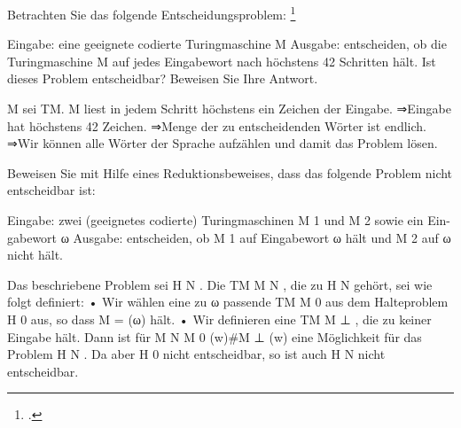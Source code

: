 \documentclass{bschlangaul-aufgabe}
\begin{document}

\begin{description}


\item Betrachten Sie das folgende Entscheidungsproblem:
\footcite[Aufgabe 10]{theo:ab:4}

Eingabe: eine geeignete codierte Turingmaschine M
Ausgabe: entscheiden, ob die Turingmaschine M auf jedes Eingabewort nach
höchstens 42 Schritten hält.
Ist dieses Problem entscheidbar? Beweisen Sie Ihre Antwort.

\begin{bAntwort}
M sei TM. M liest in jedem Schritt höchstens ein Zeichen der Eingabe.
⇒Eingabe hat höchstens 42 Zeichen.
⇒Menge der zu entscheidenden Wörter ist endlich.
⇒Wir können alle Wörter der Sprache aufzählen und damit das Problem lösen.
\end{bAntwort}


\item Beweisen Sie mit Hilfe eines Reduktionsbeweises, dass das folgende
Problem nicht entscheidbar ist:

Eingabe: zwei (geeignetes codierte) Turingmaschinen M 1 und M 2 sowie ein Ein-
gabewort ω
Ausgabe: entscheiden, ob M 1 auf Eingabewort ω hält und M 2 auf ω nicht hält.

\begin{bAntwort}
Das beschriebene Problem sei H N .
Die TM M N , die zu H N gehört, sei wie folgt deﬁniert:
• Wir wählen eine zu ω passende TM M 0 aus dem Halteproblem H 0 aus, so dass
M = (ω) hält.
• Wir deﬁnieren eine TM M ⊥ , die zu keiner Eingabe hält.
Dann ist für M N M 0 (w)\#M ⊥ (w) eine Möglichkeit für das Problem H N . Da aber H 0 nicht
entscheidbar, so ist auch H N nicht entscheidbar.
\end{bAntwort}

\end{description}
\end{document}
